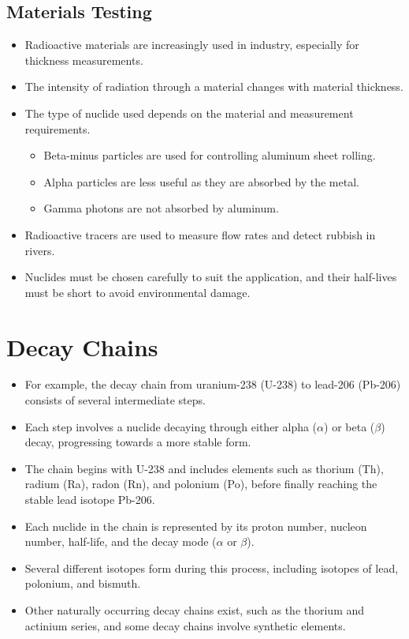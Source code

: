 \documentclass[a4paper,12pt]{article}
\let\oldsection\section
\renewcommand\section{\clearpage\oldsection}
\begin{document}
\subsection{Materials Testing}

\begin{itemize}
  \item Radioactive materials are increasingly used in industry, especially for thickness measurements.
  \item The intensity of radiation through a material changes with material thickness.
  \item The type of nuclide used depends on the material and measurement requirements.
        \begin{itemize}
          \item Beta-minus particles are used for controlling aluminum sheet rolling.
          \item Alpha particles are less useful as they are absorbed by the metal.
          \item Gamma photons are not absorbed by aluminum.
        \end{itemize}
  \item Radioactive tracers are used to measure flow rates and detect rubbish in rivers.
  \item Nuclides must be chosen carefully to suit the application, and their half-lives must be short to avoid environmental damage.
\end{itemize}


\section{Decay Chains}

\begin{itemize}
  \item For example, the decay chain from uranium-238 (U-238) to lead-206 (Pb-206) consists of several intermediate steps.
  \item Each step involves a nuclide decaying through either alpha ($\alpha$) or beta ($\beta$) decay, progressing towards a more stable form.
  \item The chain begins with U-238 and includes elements such as thorium (Th), radium (Ra), radon (Rn), and polonium (Po), before finally reaching the stable lead isotope Pb-206.
  \item Each nuclide in the chain is represented by its proton number, nucleon number, half-life, and the decay mode ($\alpha$ or $\beta$).
  \item Several different isotopes form during this process, including isotopes of lead, polonium, and bismuth.
  \item Other naturally occurring decay chains exist, such as the thorium and actinium series, and some decay chains involve synthetic elements.
\end{itemize}
\end{document}
